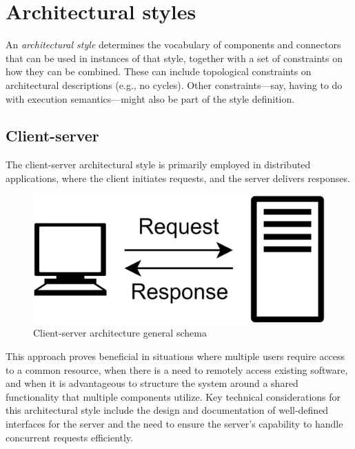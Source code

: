 \section{Architectural styles}  

\begin{definition}
    An \emph{architectural style} determines the vocabulary of components and connectors that can be used in instances of that style, together with a set of constraints on how they can be combined.
    These can include topological constraints on architectural descriptions (e.g., no cycles). 
    Other constraints—say, having to do with execution semantics—might also be part of the style definition.
\end{definition}

\subsection*{Client-server}
The client-server architectural style is primarily employed in distributed applications, where the client initiates requests, and the server delivers responses.
\begin{figure}[H]
    \centering
    \includegraphics[width=0.35\linewidth]{images/clientserver.png}
    \caption{Client-server architecture general schema}
\end{figure}
This approach proves beneficial in situations where multiple users require access to a common resource, when there is a need to remotely access existing software, and when it is advantageous to structure the system around a shared functionality that multiple components utilize.
Key technical considerations for this architectural style include the design and documentation of well-defined interfaces for the server and the need to ensure the server's capability to handle concurrent requests efficiently.

